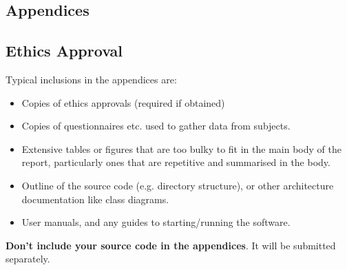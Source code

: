 \documentclass{l4proj}
\begin{document}
%
% 

\begin{appendices}

\chapter{Appendices}

\section{Ethics Approval}

Typical inclusions in the appendices are:

\begin{itemize}
\item
  Copies of ethics approvals (required if obtained)
\item
  Copies of questionnaires etc. used to gather data from subjects.
\item
  Extensive tables or figures that are too bulky to fit in the main body of
  the report, particularly ones that are repetitive and summarised in the body.

\item Outline of the source code (e.g. directory structure), or other architecture documentation like class diagrams.

\item User manuals, and any guides to starting/running the software.

\end{itemize}

\textbf{Don't include your source code in the appendices}. It will be
submitted separately.

\end{appendices}






\end{document}
